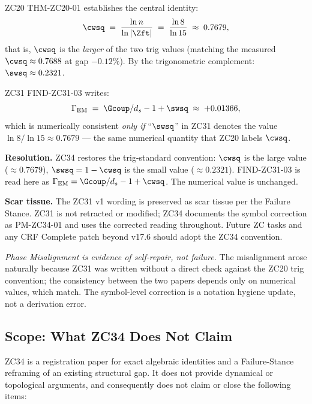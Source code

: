 \documentclass[12pt, a4paper]{article}
\begin{document}
\begin{keybox}[title={PM-ZC34-01: $\sin^2/\cos^2$ symbol
  inconsistency between ZC20 and ZC31}]
ZC20 THM-ZC20-01 establishes the central identity:
\[
  \cwsq \;=\; \frac{\ln n}{\ln |\Zft|}
        \;=\; \frac{\ln 8}{\ln 15}
        \;\approx\; 0.7679,
\]
that is, $\cwsq$ is the \emph{larger} of the two trig values
(matching the measured $\cwsq \approx 0.7688$ at gap $-0.12\%$).
By the trigonometric complement: $\swsq \approx 0.2321$.

\medskip
ZC31 FIND-ZC31-03 writes:
\[
  \Gamma_{\rm EM} \;=\; \Gcoup/d_s - 1 + \swsq
                \;\approx\; +0.01366,
\]
which is numerically consistent \emph{only if} ``$\swsq$'' in
ZC31 denotes the value $\ln 8/\ln 15 \approx 0.7679$ --- the
same numerical quantity that ZC20 labels $\cwsq$.

\medskip
\textbf{Resolution.} ZC34 restores the trig-standard
convention: $\cwsq$ is the large value ($\approx 0.7679$),
$\swsq = 1 - \cwsq$ is the small value ($\approx 0.2321$).
FIND-ZC31-03 is read here as
$\Gamma_{\rm EM} = \Gcoup/d_s - 1 + \cwsq$. The numerical
value is unchanged.

\medskip
\textbf{Scar tissue.} The ZC31 v1 wording is preserved as
scar tissue per the Failure Stance. ZC31 is not retracted or
modified; ZC34 documents the symbol correction as PM-ZC34-01
and uses the corrected reading throughout. Future ZC tasks
and any CRF Complete patch beyond v17.6 should adopt the
ZC34 convention.

\medskip
\textit{Phase Misalignment is evidence of self-repair, not
failure.} The misalignment arose naturally because ZC31 was
written without a direct check against the ZC20 trig
convention; the consistency between the two papers depends
only on numerical values, which match. The symbol-level
correction is a notation hygiene update, not a derivation
error.
\end{keybox}

\subsection{Scope: What ZC34 Does Not Claim}
\label{sec:scope}

ZC34 is a registration paper for exact algebraic identities
and a Failure-Stance reframing of an existing structural gap.
It does not provide dynamical or topological arguments, and
consequently does not claim or close the following items:
\end{document}
